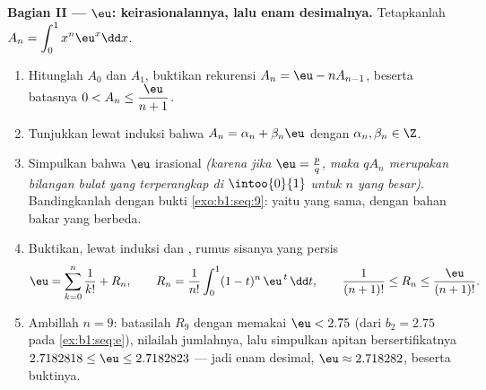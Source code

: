 \begin{problem}
\medskip
\noindent\textbf{Bagian II --- $\eu$: keirasionalannya, lalu enam
desimalnya.} Tetapkanlah $A_n = \displaystyle\int_0^1 x^n \eu^x \dd x$.
\begin{enumerate}[resume]
  \item Hitunglah $A_0$ dan $A_1$, buktikan rekurensi $A_n = \eu
        - n A_{n-1}$, beserta batasnya $0 < A_n \leq
        \dfrac{\eu}{n+1}$.
  \item Tunjukkan lewat induksi bahwa $A_n = \alpha_n + \beta_n \eu$
        dengan $\alpha_n, \beta_n \in \Z$.
  \item Simpulkan bahwa $\eu$ irasional \emph{(karena jika $\eu = \frac
        pq$, maka $q A_n$ merupakan bilangan bulat yang terperangkap di
        $\intoo{0}{1}$ untuk $n$ yang besar)}. Bandingkanlah dengan bukti
        \cref{exo:b1:seq:9}: yaitu  yang sama, dengan bahan bakar yang berbeda.
  \item Buktikan, lewat induksi dan , rumus
        sisanya yang persis
        \[
        \eu = \sum_{k=0}^{n} \frac{1}{k!} + R_n,
        \qquad
        R_n = \frac{1}{n!}\int_0^1 (1 - t)^n\,\eu^{\,t}\,\dd t,
        \qquad
        \frac{1}{(n+1)!} \leq R_n \leq \frac{\eu}{(n+1)!} .
        \]
  \item Ambillah $n = 9$: batasilah $R_9$ dengan memakai $\eu < 2.75$ (dari
        $b_2 = 2.75$ pada \cref{ex:b1:seq:e}), nilailah jumlahnya,
        lalu simpulkan apitan bersertifikatnya $2.7182818 \leq
        \eu \leq 2.7182823$ --- jadi enam desimal, $\eu \approx
        2.718282$, beserta buktinya.
\end{enumerate}


\end{problem}
